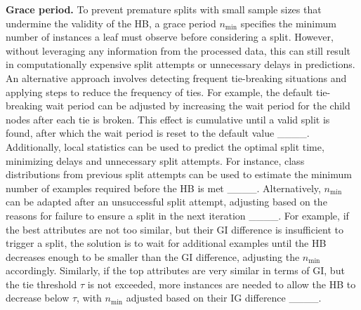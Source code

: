 \textbf{Grace period.} To prevent premature splits with small sample sizes that undermine the validity of the HB, a grace period \( n_{\min} \) specifies the minimum number of instances a leaf must observe before considering a split. However, without leveraging any information from the processed data, this can still result in computationally expensive split attempts or unnecessary delays in predictions. An alternative approach involves detecting frequent tie-breaking situations and applying steps to reduce the frequency of ties. For example, the default tie-breaking wait period can be adjusted by increasing the wait period for the child nodes after each tie is broken. This effect is cumulative until a valid split is found, after which the wait period is reset to the default value ____. Additionally, local statistics can be used to predict the optimal split time, minimizing delays and unnecessary split attempts. For instance, class distributions from previous split attempts can be used to estimate the minimum number of examples required before the HB is met ____. Alternatively, \( n_{\min} \) can be adapted after an unsuccessful split attempt, adjusting based on the reasons for failure to ensure a split in the next iteration ____. For example, if the best attributes are not too similar, but their GI difference is insufficient to trigger a split, the solution is to wait for additional examples until the HB decreases enough to be smaller than the GI difference, adjusting the \( n_{\min} \) accordingly. Similarly, if the top attributes are very similar in terms of GI, but the tie threshold \( \tau \) is not exceeded, more instances are needed to allow the HB to decrease below \( \tau \), with \( n_{\min} \) adjusted based on their IG difference ____.

